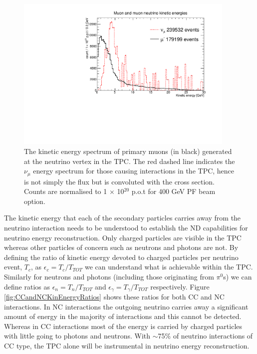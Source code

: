 \begin{figure}
\begin{center}
  	\includegraphics[width=105mm]{Chapter4/figures/muon_and_muNeutrino_kinEnergies.pdf}
	\caption{The kinetic energy spectrum of primary muons (in black) generated at the neutrino vertex in the TPC. The red dashed line indicates the $\nu_{\mu}$ energy spectrum for those causing interactions in the TPC, hence is not simply the flux but is convoluted with the cross section. Counts are normalised to 1 $\times$ 10$^{20}$ p.o.t for 400 GeV PF beam option.}
	\label{fig:muonEnergySpectrum}
\end{center}
\end{figure}

The kinetic energy that each of the secondary particles carries away from the neutrino interaction needs to be understood to establish the ND capabilities for neutrino energy reconstruction. Only charged particles are visible in the TPC whereas other particles of concern such as neutrons and photons are not. By defining the ratio of kinetic energy devoted to charged particles per neutrino event, $T_{c}$, as $\epsilon_{c} = T_{c}/T_{TOT}$ we can understand what is achievable within the TPC. Similarly for neutrons and photons (including those originating from $\pi^{0}$s)  we can define ratios as $\epsilon_{n} = T_{n}/T_{TOT}$ and $\epsilon_{\gamma} = T_{\gamma}/T_{TOT}$ respectively. Figure \ref{fig:CCandNCKinEnergyRatios} shows these ratios for both CC and NC interactions. In NC interactions the outgoing neutrino carries away a significant amount of energy in the majority of interactions and this cannot be detected. Whereas in CC interactions most of the energy is carried by charged particles with little going to photons and neutrons. With $\sim$75\% of neutrino interactions of CC type, the TPC alone will be instrumental in neutrino energy reconstruction.

